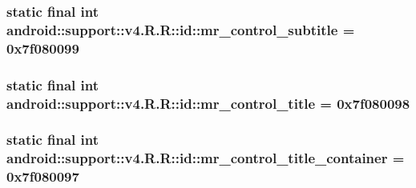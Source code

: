 \hypertarget{classandroid_1_1support_1_1v4_1_1_r_1_1id_19e04a81c95972cac78e69091c96c55d}{
\subsubsection[{mr\_\-control\_\-subtitle}]{\setlength{\rightskip}{0pt plus 5cm}static final int android::support::v4.R.R::id::mr\_\-control\_\-subtitle = 0x7f080099}}
\label{classandroid_1_1support_1_1v4_1_1_r_1_1id_19e04a81c95972cac78e69091c96c55d}


\hypertarget{classandroid_1_1support_1_1v4_1_1_r_1_1id_785924c00518edca476aaa5b8fdde5ad}{
\subsubsection[{mr\_\-control\_\-title}]{\setlength{\rightskip}{0pt plus 5cm}static final int android::support::v4.R.R::id::mr\_\-control\_\-title = 0x7f080098}}
\label{classandroid_1_1support_1_1v4_1_1_r_1_1id_785924c00518edca476aaa5b8fdde5ad}


\hypertarget{classandroid_1_1support_1_1v4_1_1_r_1_1id_c6cf21bd15f73957f889c745e9fbb292}{
\subsubsection[{mr\_\-control\_\-title\_\-container}]{\setlength{\rightskip}{0pt plus 5cm}static final int android::support::v4.R.R::id::mr\_\-control\_\-title\_\-container = 0x7f080097}}
\label{classandroid_1_1support_1_1v4_1_1_r_1_1id_c6cf21bd15f73957f889c745e9fbb292}



